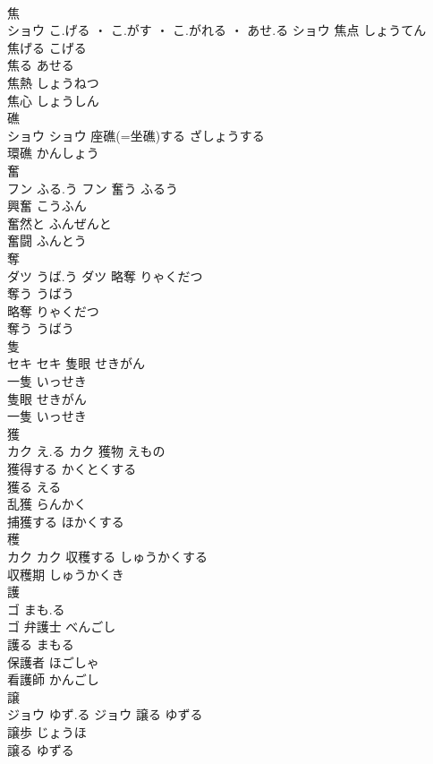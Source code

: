 \documentclass[8pt]{extreport}
\begin{document}
\begin{CJK}{UTF8}{min}
\\	焦	
\\	ショウ	こ.げる ・ こ.がす ・ こ.がれる ・ あせ.る	ショウ	焦点	しょうてん	
\\	焦げる	こげる	
\\	焦る	あせる	
\\	焦熱	しょうねつ	
\\	焦心	しょうしん	
\\	礁	
\\	ショウ		ショウ	座礁(=坐礁)する	ざしょうする	
\\	環礁	かんしょう	
\\	奮	
\\	フン	ふる.う	フン	奮う	ふるう	
\\	興奮	こうふん	
\\	奮然と	ふんぜんと	
\\	奮闘	ふんとう	
\\	奪	
\\	ダツ	うば.う	ダツ	略奪	りゃくだつ	
\\	奪う	うばう	
\\	略奪	りゃくだつ	
\\	奪う	うばう	
\\	隻	
\\	セキ		セキ	隻眼	せきがん	
\\	一隻	いっせき	
\\	隻眼	せきがん	
\\	一隻	いっせき	
\\	獲	
\\	カク	え.る	カク	獲物	えもの	
\\	獲得する	かくとくする	
\\	獲る	える	
\\	乱獲	らんかく	
\\	捕獲する	ほかくする	
\\	穫	
\\	カク		カク	収穫する	しゅうかくする	
\\	収穫期	しゅうかくき	
\\	護	
\\	ゴ	まも.る
\\	ゴ	弁護士	べんごし	
\\	護る	まもる	
\\	保護者	ほごしゃ	
\\	看護師	かんごし	
\\	譲	
\\	ジョウ	ゆず.る	ジョウ	譲る	ゆずる	
\\	譲歩	じょうほ	
\\	譲る	ゆずる	

\end{CJK}
\end{document}
